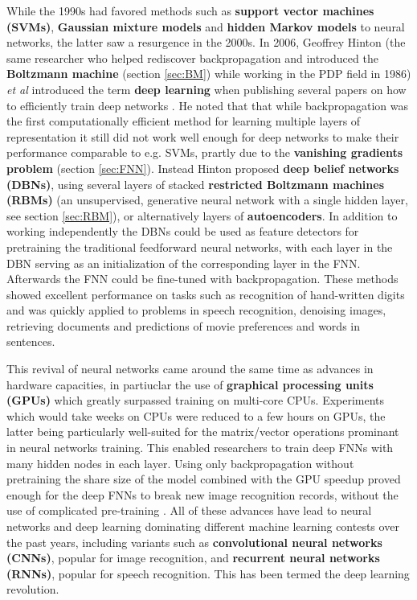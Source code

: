 \documentclass[twoside,english]{uiofysmaster}
\begin{document}
While the 1990s had favored methods such as \textbf{support vector machines (SVMs)}, \textbf{Gaussian mixture models} and \textbf{hidden Markov models} to neural networks, the latter saw a resurgence in the 2000s. In 2006, Geoffrey Hinton (the same researcher who helped rediscover backpropagation and introduced the \textbf{Boltzmann machine} (section \ref{sec:BM}) while working in the PDP field in 1986) \textit{et al} introduced the term \textbf{deep learning} when publishing several papers on how to efficiently train deep networks \cite{Hinton2006a} \cite{Hinton2006} \cite{Hinton2007}. He noted that that while backpropagation was the first computationally efficient method for learning multiple layers of representation it still did not work well enough for deep networks to make their performance comparable to e.g. SVMs, prartly due to the \textbf{vanishing gradients problem} (section \ref{sec:FNN}).
Instead Hinton proposed \textbf{deep belief networks (DBNs)}, using several layers of stacked \textbf{restricted Boltzmann machines (RBMs)} (an unsupervised, generative neural network with a single hidden layer, see section \ref{sec:RBM}), or alternatively layers of \textbf{autoencoders}. In addition to working independently the DBNs could be used as feature detectors for pretraining the traditional feedforward neural networks, with each layer in the DBN serving as an initialization of the corresponding layer in the FNN. Afterwards the FNN could be fine-tuned with backpropagation. These methods showed excellent performance on tasks such as recognition of hand-written digits and was quickly applied to problems in speech recognition, denoising images, retrieving documents and predictions of movie preferences and words in sentences. 

This revival of neural networks came around the same time as advances in hardware capacities, in partiuclar the use of \textbf{graphical processing units (GPUs)} which greatly surpassed training on multi-core CPUs. Experiments which would take weeks on CPUs were reduced to a few hours on GPUs, the latter being particularly well-suited for the matrix/vector operations prominant in neural networks training. This enabled researchers to train deep FNNs with many hidden nodes in each layer. Using only backpropagation without pretraining the share size of the model combined with the GPU speedup proved enough for the deep FNNs to break new image recognition records, without the use of complicated pre-training \cite{Ciresan2010}. All of these advances have lead to neural networks and deep learning dominating different machine learning contests over the past years, including variants such as \textbf{convolutional neural networks (CNNs)}, popular for image recognition, and \textbf{recurrent neural networks (RNNs)}, popular for speech recognition. This has been termed the deep learning revolution. 
\end{document}
